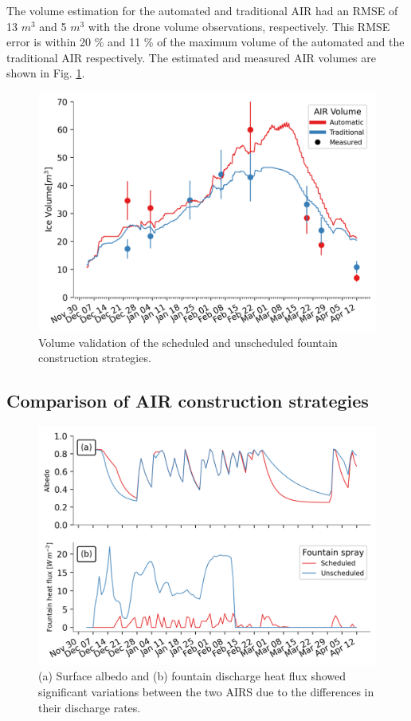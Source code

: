 \documentclass[tc, manuscript]{copernicus}
\begin{document}
The volume estimation for the automated and traditional AIR had an RMSE of 13 $m^3$ and 5 $m^3$ with the drone
volume observations, respectively. This RMSE error is within 20 \% and 11 \% of the maximum volume of the
automated and the traditional AIR respectively. The estimated and measured AIR volumes are shown in Fig.
\ref{fig:validation}.  

\begin{figure}[t] \includegraphics[width=12cm] {Figures/validation.png} \caption{Volume validation of the
scheduled and unscheduled fountain construction strategies.} \label{fig:validation} \end{figure}

\subsection{Comparison of AIR construction strategies}

\begin{figure}[t]
\includegraphics[width=12cm]{Figures/dis_processes.png}
\caption{(a) Surface albedo  and (b) fountain discharge heat flux showed significant variations between the two
  AIRS due to the differences in their discharge rates.}
\label{fig:dis_processes}
\end{figure}
\end{document}

